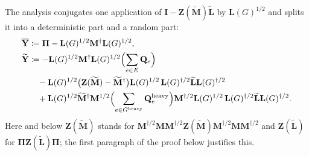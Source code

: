 \documentclass[11pt]{article}
\theoremstyle{remark}
\newcommand{\II}{\mathbf I}
\newcommand{\LL}{\mathbf L}
\newcommand{\LLtil}{{\widetilde{\LL}}}
\newcommand{\MM}{\mathbf M}
\newcommand{\MMtil}{{\widetilde{\MM}}}
\newcommand{\PPi}{{\boldsymbol\Pi}}
\newcommand{\QQ}{\mathbf Q}
\newcommand{\YY}{\mathbf{Y}}
\newcommand{\YYbar}{{\overline{\YY}}}
\newcommand{\YYtil}{{\widetilde{\YY}}}
\newcommand{\ZZ}{\mathbf Z}
\newcommand{\Gh}{G^{\mathrm{heavy}}}
\newcommand{\defeq}{\coloneqq}
\begin{document}
The analysis conjugates one application of $\II-\ZZ(\MMtil)\LLtil$ by
$\LL(G)^{1/2}$ and splits it into a deterministic part and a random part:
\begin{equation}\label{eq:cubic}
\begin{aligned}
\YYbar&\defeq\PPi-\LL(G)^{1/2}\MM^{\dag}\LL(G)^{1/2},\\
\YYtil&\defeq-\LL(G)^{1/2}\MM^{\dag}\LL(G)^{1/2}\Bigl(\sum_{e\in E}\QQ_e\Bigr)\\
&\quad-\LL(G)^{1/2}\bigl(\ZZ(\MMtil)-\MMtil^{\dag}\bigr)\LL(G)^{1/2}\,\LL(G)^{\dag/2}\LLtil\LL(G)^{\dag/2}\\
&\quad+\LL(G)^{1/2}\MMtil^{\dag}\MM^{1/2}\Bigl(\sum_{e\in\Gh}\QQ^{\mathrm{heavy}}_e\Bigr)\MM^{\dag/2}\LL(G)^{1/2}\,\LL(G)^{\dag/2}\LLtil\LL(G)^{\dag/2}.
\end{aligned}
\end{equation}
Here and below $\ZZ(\MMtil)$ stands for $\MM^{\dag/2}\MM\MM^{\dag/2}\ZZ(\MMtil)\MM^{\dag/2}\MM\MM^{\dag/2}$
and $\ZZ(\LLtil)$ for $\PPi\ZZ(\LLtil)\PPi$; the first paragraph of the
proof below justifies this.
\end{document}
